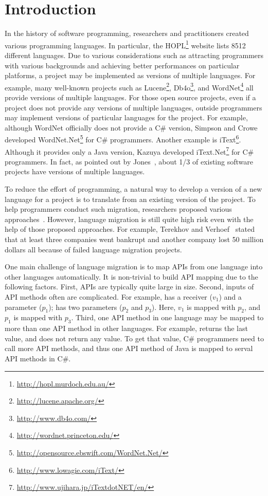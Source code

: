 \section{Introduction}
\label{sec:introduction} In the history of software programming,
researchers and practitioners created various programming languages.
In particular, the HOPL\footnote{\url{http://hopl.murdoch.edu.au/}}
website lists 8512 different languages. Due to various
considerations such as attracting programmers with various
backgrounds and achieving better performances on particular
platforms, a project may be implemented as versions of multiple
languages. For example, many well-known projects such as
Lucene\footnote{\url{http://lucene.apache.org/}},
Db4o\footnote{\url{http://www.db4o.com/}}, and
WordNet\footnote{\url{http://wordnet.princeton.edu/}} all provide
versions of multiple languages. For those open source projects, even
if a project does not provide any versions of multiple languages,
outside programmers may implement versions of particular languages
for the project. For example, although WordNet officially does not
provide a C\# version, Simpson and Crowe developed
WordNet.Net\footnote{\url{http://opensource.ebswift.com/WordNet.Net/}}
for C\# programmers. Another example is
iText\footnote{\url{http://www.lowagie.com/iText/}}. Although it
provides only a Java version, Kazuya developed
iText.Net\footnote{\url{http://www.ujihara.jp/iTextdotNET/en/}} for
C\# programmers. In fact, as pointed out by
Jones~\cite{jones1998estimating}, about 1/3 of existing software
projects have versions of multiple languages.

To reduce the effort of programming, a natural way to develop a
version of a new language for a project is to translate from an
existing version of the project. To help programmers conduct such
migration, researchers proposed various
approaches~\cite{mossienko2003automated,yasumatsu1995spice,hainaut2008migration}.
However, language migration is still quite high risk even with the
help of those proposed approaches. For example, Terekhov and
Verhoef~\cite{terekhov2000realities} stated that at least three
companies went bankrupt and another company lost 50 million dollars
all because of failed language migration projects.

One main challenge of language migration is to map APIs from one
language into other languages automatically. It is non-trivial to
build API mapping due to the following factors. First, APIs are
typically quite large in size. Second, inputs of API methods often
are complicated. For example,  has a receiver ($v_1$) and a parameter ($p_1$);
 has two
parameters ($p_2$ and $p_3$). Here, $v_1$ is mapped with $p_2$, and
$p_1$ is mapped with $p_3$. Third, one API method in one language
may be mapped to more than one API method in other languages. For
example,  returns the
last value, and  does not return any
value. To get that value, C\# programmers need to call more API
methods, and thus one API method of Java is mapped to serval API
methods in C\#.


